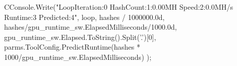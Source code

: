 \begin{adjustbox}{width=\textwidth,height=15cm,keepaspectratio}
\begin{Code}[CSharpStyle]
    CConsole.Write("LoopIteration:{0}  HashCount:{1:0.00}MH  Speed:{2:0.0}MH/s  Runtime:{3}  Predicted:{4}", 
    loop, 
    hashes / 1000000.0d, 
    hashes/gpu_runtime_sw.ElapsedMilliseconds/1000.0d, 
    gpu_runtime_sw.Elapsed.ToString().Split('.')[0], 
    parms.ToolConfig.PredictRuntime(hashes * 1000/gpu_runtime_sw.ElapsedMilliseconds)
);
\end{Code}
\end{adjustbox}